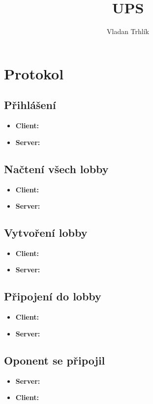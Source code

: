 \documentclass[12pt,a4paper]{article}
\author{Vladan Trhlík}
\title{UPS}
\begin{document}
\maketitle

\section{Protokol}

\subsection{Přihlášení}
\begin{itemize}
	\item \textbf{Client:} 
	\item \textbf{Server:} 
\end{itemize}

\subsection{Načtení všech lobby}
\begin{itemize}
	\item \textbf{Client:} 
	\item \textbf{Server:} 
\end{itemize}

\subsection{Vytvoření lobby}
\begin{itemize}
	\item \textbf{Client:} 
	\item \textbf{Server:} 
\end{itemize}

\subsection{Připojení do lobby}
\begin{itemize}
	\item \textbf{Client:} 
	\item \textbf{Server:} 
\end{itemize}

\subsection{Oponent se připojil}
\begin{itemize}
	\item \textbf{Server:} 
	\item \textbf{Client:} 
\end{itemize}
\end{document}
